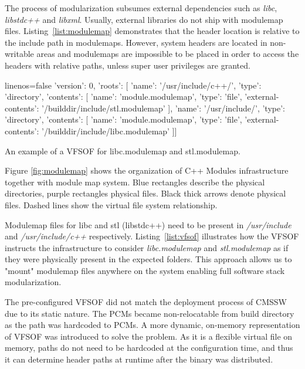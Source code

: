 \documentclass[12pt]{iopart}
\begin{document}
The process of modularization subsumes external dependencies such as \textit{libc}, \textit{libstdc++} and \textit{libxml}. Usually, external libraries do not ship with modulemap files. Listing~\ref{list:modulemap} demonstrates that the header location is relative to the include path in modulemaps. However, system headers are located in non-writable areas and modulemaps are impossible to be placed in order to access the headers with relative paths, unless super user privileges are granted.

\begin{listing}[h]
\noindent
\begin{minipage}[h]{\textwidth}
\begin{cppcode*}{linenos=false}
{ 'version': 0,
  'roots': [
    { 'name': '/usr/include/c++/', 'type': 'directory',
      'contents': [
        { 'name': 'module.modulemap', 'type': 'file',
          'external-contents': '/builddir/include/stl.modulemap' }]},
    { 'name': '/usr/include/', 'type': 'directory',
      'contents': [
        { 'name': 'module.modulemap', 'type': 'file',
          'external-contents': '/builddir/include/libc.modulemap'
        }]}]}
\end{cppcode*}
\end{minipage}
\caption{An example of a VFSOF for libc.modulemap and stl.modulemap.}
\label{list:vfsof}
\end{listing}

Figure \ref{fig:modulemap} shows the organization of C++ Modules infrastructure together with module map system. Blue rectangles describe the physical directories, purple rectangles physical files. Black thick arrows denote physical files. Dashed lines show the virtual file system relationship.

Modulemap files for libc and stl (libstdc++) need to be present in \textit{/usr/include} and \textit{/usr/include/c++} respectively. Listing~\ref{list:vfsof} illustrates how the VFSOF instructs the infrastructure to consider \textit{libc.modulemap} and \textit{stl.modulemap} as if they were physically present in the expected folders. This approach allows us to "mount" modulemap files anywhere on the system enabling full software stack modularization.

The pre-configured VFSOF did not match the deployment process of CMSSW due to its static nature. The PCMs became non-relocatable from build directory as the path was hardcoded to PCMs. A more dynamic, on-memory representation of VFSOF was introduced to solve the problem. As it is a flexible virtual file on memory, paths do not need to be hardcoded at the configuration time, and thus it can determine header paths at runtime after the binary was distributed.
\end{document}
